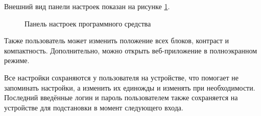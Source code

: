 Внешний вид панели настроек показан на рисунке \ref{fig:settings}.

\begin{figure}[ht]
    \centering
    \caption{Панель настроек программного средства}
    \label{fig:settings}
\end{figure}

Также пользователь может изменить положение всех блоков, контраст и компактность. Дополнительно, можно открыть веб-приложение
в полноэкранном режиме.

Все настройки сохраняются у пользователя на устройстве, что помогает не запоминать настройки, а изменить их единожды и изменять при 
необходимости. Последний введённые логин и пароль пользователем также сохраняется на устройстве для подстановки в момент следующего
входа.